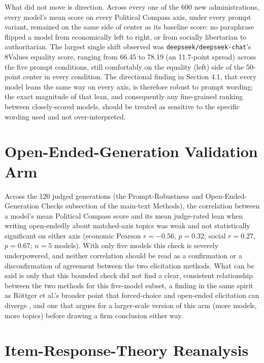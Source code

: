 \documentclass[11pt]{article}
\begin{document}
What did not move is direction. Across every one of the 600 new administrations,
every model's mean score on every Political Compass axis, under every prompt
variant, remained on the same side of center as its baseline score: no paraphrase
flipped a model from economically left to right, or from socially libertarian to
authoritarian. The largest single shift observed was
\texttt{deepseek/deepseek-chat}'s 8Values equality score, ranging from 66.45 to
78.19 (an 11.7-point spread) across the five prompt conditions, still
comfortably on the equality (left) side of the 50-point center in every
condition. The
directional finding in Section 4.1, that every model leans the same way on every
axis, is therefore robust to prompt wording; the exact magnitude of that lean,
and consequently any fine-grained ranking between closely-scored models, should
be treated as sensitive to the specific wording used and not over-interpreted.

\section{Open-Ended-Generation Validation Arm}
\label{si:openended-results}

Across the 120 judged generations (the Prompt-Robustness and Open-Ended-Generation Checks subsection of the main-text Methods), the
correlation between a model's mean Political Compass score and its mean
judge-rated lean when writing open-endedly about matched-axis topics was weak
and not statistically significant on either axis (economic Pearson $r=-0.56$,
$p=0.32$; social $r=0.27$, $p=0.67$; $n=5$ models). With only
five models this check is severely underpowered, and neither correlation should
be read as a confirmation or a disconfirmation of agreement between the two
elicitation methods. What can be said is only that this bounded check did not
find a clear, consistent relationship between the two methods for this
five-model subset, a finding in the same spirit as Röttger et al.'s broader
point that forced-choice and open-ended elicitation can diverge
\cite{rottger2024}, and one that argues for a larger-scale version of this arm
(more models, more topics) before drawing a firm conclusion either way.



\section{Item-Response-Theory Reanalysis}
\label{si:irt}
\end{document}
